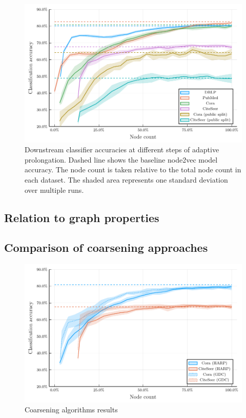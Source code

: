 \begin{figure}
  \centering
  \includegraphics[width = \linewidth]{images/adaptive-coarsening/adaptive-coarsening.pdf}
  \caption{Downstream classifier accuracies at different steps of adaptive prolongation. Dashed line shows the baseline node2vec model accuracy. The node count is taken relative to the total node count in each dataset. The shaded area represents one standard deviation over multiple runs.}
  \label{fig:adaptive-coarsening}
\end{figure}

\subsection{Relation to graph properties}


\subsection{Comparison of coarsening approaches}

\begin{figure}
  \centering
  \includegraphics[width=\linewidth]{images/coarsening-algorithms/coarsening-algorithms.pdf}
  \caption{Coarsening algorithms results}
  \label{fig:coarsening-algorithms}
\end{figure}
